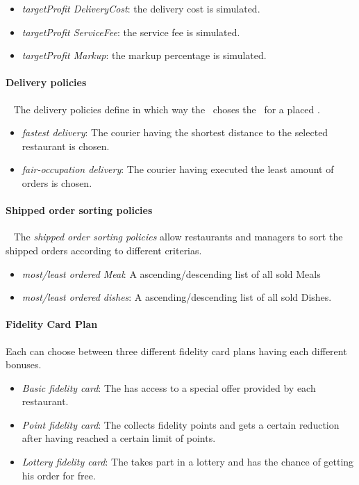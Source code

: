 \begin{itemize}
    \item \emph{targetProfit DeliveryCost}: the delivery cost is simulated.
    \item \emph{targetProfit ServiceFee}: the service fee is simulated.
    \item \emph{targetProfit Markup}: the markup percentage is simulated.
\end{itemize}

\paragraph{Delivery policies}~\vspace{0.3\baselineskip}
The delivery policies define in which way the \Core~choses the \Courier~for a placed \Order.

\begin{itemize}
    \item \emph{fastest delivery}: The courier having the shortest distance to the selected restaurant is chosen.
    \item \emph{fair-occupation delivery}: The courier having executed the least amount of orders is chosen.
\end{itemize}

\paragraph{Shipped order sorting policies}~\vspace{0.3\baselineskip}
The \emph{shipped order sorting policies} allow restaurants and managers
to sort the shipped orders according to different criterias.

\begin{itemize}
    \item \emph{most/least ordered Meal}: A ascending/descending list of all sold Meals
    \item \emph{most/least ordered dishes}: A ascending/descending list of all sold Dishes.
\end{itemize}

\paragraph{Fidelity Card Plan} 
\label{sub:fid_card_plan}

Each \Customer can choose between three different fidelity card plans having each different bonuses.

\begin{itemize}
  \item \emph{Basic fidelity card}: The \Customer has access to a special offer provided by each restaurant.
  \item \emph{Point fidelity card}: The \Customer collects fidelity points
  and gets a certain reduction after 
	having reached a certain limit of points.
	\item \emph{Lottery fidelity card}: The \Customer takes part in a lottery
  and has the chance of getting his order for free.
\end{itemize}

